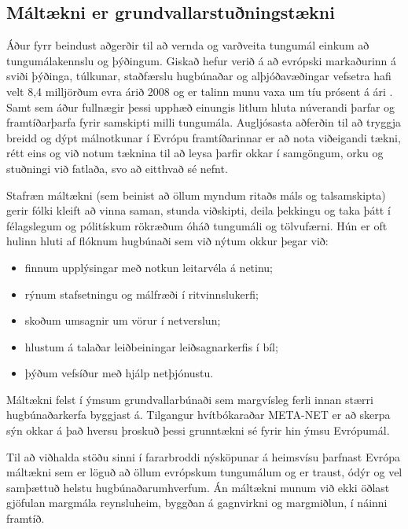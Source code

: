 \documentclass{../../metanetpaper}
\begin{document}
\begin{multicols}{2}
\subsection{Máltækni er grundvallarstuðningstækni}

Áður fyrr beindust aðgerðir til að vernda og varðveita tungumál einkum að tungumálakennslu og þýðingum. Giskað hefur verið á að evrópski markaðurinn á sviði þýðinga, túlkunar, staðfærslu hugbúnaðar og alþjóðavæðingar vefsetra hafi velt 8,4 milljörðum evra árið 2008 og er talinn munu vaxa um tíu prósent á ári \cite{EC3}. Samt sem áður fullnægir þessi upphæð einungis litlum hluta núverandi þarfar og framtíðarþarfa fyrir samskipti milli tungumála. Augljósasta aðferðin til að tryggja breidd og dýpt málnotkunar í Evrópu framtíðarinnar er að nota viðeigandi tækni, rétt eins og við notum tæknina til að leysa þarfir okkar í samgöngum, orku og stuðningi við fatlaða, svo að eitthvað sé nefnt. 

Stafræn máltækni (sem beinist að öllum myndum ritaðs máls og talsamskipta) gerir fólki kleift að vinna saman, stunda viðskipti, deila þekkingu og taka þátt í félagslegum og pólitískum rökræðum óháð tungumáli og tölvufærni. Hún er oft hulinn hluti af flóknum hugbúnaði sem við nýtum okkur þegar við:

\begin{itemize}
\item finnum upplýsingar með notkun leitarvéla á netinu;
\item rýnum stafsetningu og málfræði í ritvinnslukerfi;
\item skoðum umsagnir um vörur í netverslun;
\item hlustum á talaðar leiðbeiningar leiðsagnarkerfis í bíl;
\item þýðum vefsíður með hjálp netþjónustu.
\end{itemize}

Máltækni felst í ýmsum grundvallarbúnaði sem margvísleg ferli innan stærri hugbúnaðarkerfa byggjast á. Tilgangur hvítbókaraðar META-NET er að skerpa sýn okkar á það hversu þroskuð þessi grunntækni sé fyrir hin ýmsu Evrópumál. 


Til að viðhalda stöðu sinni í fararbroddi nýsköpunar á heimsvísu þarfnast Evrópa máltækni sem er löguð að öllum evrópskum tungumálum og er traust, ódýr og vel samþættuð helstu hugbúnaðarumhverfum. Án máltækni munum við ekki öðlast gjöfulan margmála reynsluheim, byggðan á gagnvirkni og margmiðlun, í náinni framtíð. 


\end{multicols}
\end{document}
